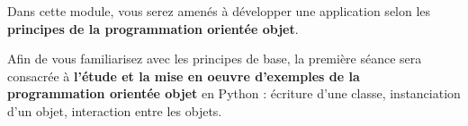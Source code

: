 
Dans cette module, vous serez amenés à développer une application selon les \textbf{principes de la programmation orientée objet}.

Afin de vous familiarisez avec les principes de base, la première séance sera consacrée à \textbf{l'étude et la mise en oeuvre d'exemples de la programmation orientée objet} en Python : écriture d'une classe, instanciation d'un objet, interaction entre les objets.



